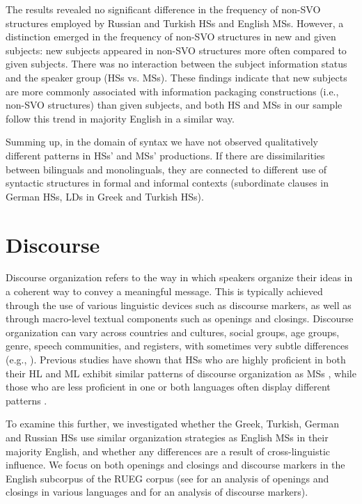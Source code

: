 \documentclass[output=paper,colorlinks,citecolor=brown]{langscibook}
\begin{document}
The results revealed no significant difference in the frequency of non-SVO structures employed by Russian and Turkish HSs and English MSs. However, a distinction emerged in the frequency of non-SVO structures in new and given subjects: new subjects appeared in non-SVO structures more often compared to given subjects. There was no interaction between the subject information status and the speaker group (HSs vs. MSs). These findings indicate that new subjects are more commonly associated with information packaging constructions (i.e., non-SVO structures) than given subjects, and both HS and MSs in our sample follow this trend in majority English in a similar way.

Summing up, in the domain of syntax we have not observed qualitatively different patterns in HSs’ and MSs' productions. If there are dissimilarities between bilinguals and monolinguals, they are connected to different use of syntactic structures in formal and informal contexts (subordinate clauses in German HSs, LDs in Greek and Turkish HSs).


\section{Discourse} \label{sec:pashkovaetal:Discourse}

Discourse organization refers to the way in which speakers organize their ideas in a coherent way to convey a meaningful message. This is typically achieved through the use of various linguistic devices such as discourse markers, as well as through macro-level textual components such as openings and closings. Discourse organization can vary across countries and cultures, social groups, age groups, genre, speech communities, and registers, with sometimes very subtle differences (e.g., \cite{FoxTree2010}). Previous studies have shown that HSs who are highly proficient in both their HL and ML exhibit similar patterns of discourse organization as MSs \parencite{Silva-Corvalán2014}, while those who are less proficient in one or both languages often display different patterns \parencite{MONTRUL2010}.~

To examine this further, we investigated whether the Greek, Turkish, German and Russian HSs use similar organization strategies as English MSs in their majority English, and whether any differences are a result of cross-linguistic influence. We focus on both openings and closings and discourse markers in the English subcorpus of the RUEG corpus (see  for an analysis of openings and closings in various languages and  for an analysis of discourse markers).
\end{document}
